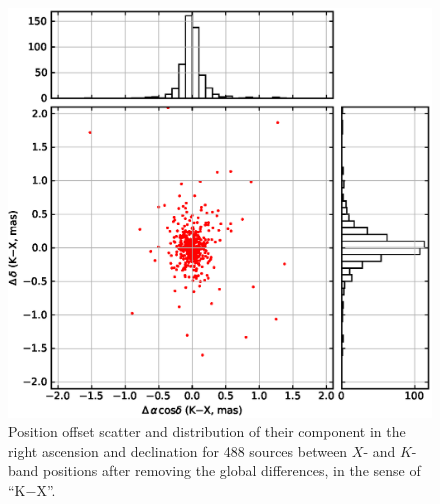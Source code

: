 \documentclass{aa-note}   %
\begin{document}
\begin{figure}[hbtp]
    \centering
    \includegraphics[width=\columnwidth]{figs/k-sx-scatter}
    \caption[]{\label{fig:k-sx-pos-offset}
        Position offset scatter and distribution of their component in the right ascension and declination for 488 sources between $X$- and $K$-band positions after removing the global differences, in the sense of ``K$-$X''.
    }
\end{figure}
\end{document}
